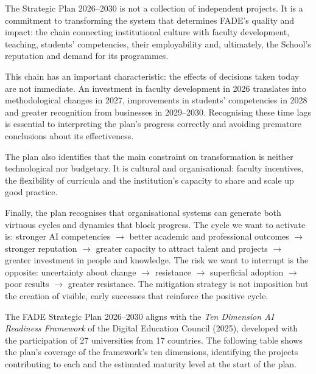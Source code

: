 \documentclass[11pt,a4paper]{scrreprt}
\begin{document}

\small
The Strategic Plan 2026--2030 is not a collection of independent projects. It is a commitment to transforming the system that determines FADE's quality and impact: the chain connecting institutional culture with faculty development, teaching, students' competencies, their employability and, ultimately, the School's reputation and demand for its programmes.

This chain has an important characteristic: the effects of decisions taken today are not immediate. An investment in faculty development in 2026 translates into methodological changes in 2027, improvements in students' competencies in 2028 and greater recognition from businesses in 2029--2030. Recognising these time lags is essential to interpreting the plan's progress correctly and avoiding premature conclusions about its effectiveness.

The plan also identifies that the main constraint on transformation is neither technological nor budgetary. It is cultural and organisational: faculty incentives, the flexibility of curricula and the institution's capacity to share and scale up good practice. 

Finally, the plan recognises that organisational systems can generate both virtuous cycles and dynamics that block progress. The cycle we want to activate is: stronger AI competencies $\rightarrow$ better academic and professional outcomes $\rightarrow$ stronger reputation $\rightarrow$ greater capacity 
to attract talent and projects $\rightarrow$ greater investment in people and knowledge. The risk we want to interrupt is the opposite: uncertainty about change $\rightarrow$ resistance $\rightarrow$ superficial adoption $\rightarrow$ poor results $\rightarrow$ greater resistance. The mitigation strategy is not imposition but the creation of visible, early successes that reinforce the positive cycle.


\small
The FADE Strategic Plan 2026--2030 aligns with the \textit{Ten Dimension AI Readiness Framework} of the Digital Education Council (2025), developed with the participation of 27 universities from 17 countries. The following table shows the plan's coverage of the framework's ten dimensions, identifying the projects contributing to each and the estimated maturity level at the start of the plan.
\end{document}
